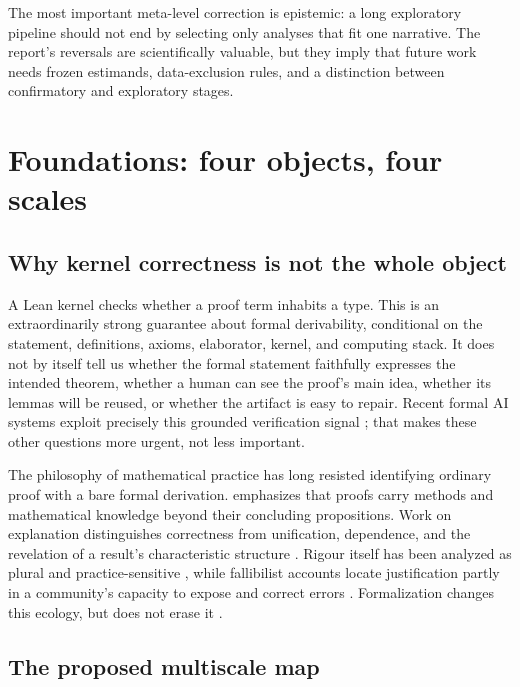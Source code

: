 \documentclass[11pt]{article}
\begin{document}
The most important meta-level correction is epistemic: a long exploratory pipeline should not
end by selecting only analyses that fit one narrative.  The report's reversals are scientifically
valuable, but they imply that future work needs frozen estimands, data-exclusion rules, and a
distinction between confirmatory and exploratory stages.

\clearpage

\section{Foundations: four objects, four scales}

\subsection{Why kernel correctness is not the whole object}

A Lean kernel checks whether a proof term inhabits a type.  This is an extraordinarily strong
guarantee about formal derivability, conditional on the statement, definitions, axioms,
elaborator, kernel, and computing stack.  It does not by itself tell us whether the formal
statement faithfully expresses the intended theorem, whether a human can see the proof's main
idea, whether its lemmas will be reused, or whether the artifact is easy to repair.  Recent formal
AI systems exploit precisely this grounded verification signal \citep{yang2023,hubert2026,ren2025};
that makes these other questions more urgent, not less important.

The philosophy of mathematical practice has long resisted identifying ordinary proof with a
bare formal derivation.  \citet{rav1999} emphasizes that proofs carry methods and mathematical
knowledge beyond their concluding propositions.  Work on explanation distinguishes correctness
from unification, dependence, and the revelation of a result's characteristic structure
\citep{mancosu2008}.  Rigour itself has been analyzed as plural and practice-sensitive
\citep{hamami2021,tanswell2024}, while fallibilist accounts locate justification partly in a
community's capacity to expose and correct errors \citep{detoffoli2021}.  Formalization changes
this ecology, but does not erase it \citep{avigad2023,avigad2024,detoffoli2026}.

\subsection{The proposed multiscale map}
\end{document}
